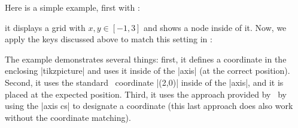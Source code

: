 \noindent Here is a simple example, first with \Tikz:
\begin{codeexample}[]
\end{codeexample}
\noindent it displays a grid with $x,y\in[-1,3]$ and shows a node inside of it.
Now, we apply the keys discussed above to match this setting in \PGFPlots:
\begin{codeexample}[]
\end{codeexample}
	\noindent The example demonstrates several things: first, it defines a coordinate in the enclosing |tikzpicture| and uses it inside of the |axis| (at the correct position). Second, it uses the standard \Tikz\ coordinate |(2,0)| inside of the |axis|, and it is placed at the expected position. Third, it uses the approach provided by \PGFPlots\ by using the |axis cs| to designate a coordinate (this last approach does also work without the coordinate matching).

